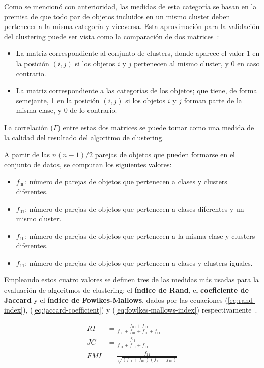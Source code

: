 Como se mencionó con anterioridad, las medidas de esta categoría se basan en la premisa de que todo par de objetos incluidos en un mismo cluster deben pertenecer a la misma categoría y viceversa.
Esta aproximación para la validación del clustering puede ser vista como la comparación de dos matrices~\cite{Tan05}:

\begin{itemize}
    \item La matriz correspondiente al conjunto de clusters, donde aparece el valor 1 en la posición $(i,j)$ si los objetos $i$ y $j$ pertenecen al mismo cluster, y 0 en caso contrario.
    \item La matriz correspondiente a las categorías de los objetos;
    que tiene, de forma semejante, 1 en la posición $(i, j)$ si los objetos $i$ y $j$ forman parte de la misma clase, y 0 de lo contrario.
\end{itemize}

La correlación ($\Gamma$) entre estas dos matrices se puede tomar como una medida de la calidad del resultado del algoritmo de clustering.

A partir de las $n(n-1)/2$ parejas de objetos que pueden formarse en el conjunto de datos, se computan los siguientes valores:

\begin{itemize}
    \item $f_{00}$: número de parejas de objetos que pertenecen a clases y clusters diferentes.
    \item $f_{01}$: número de parejas de objetos que pertenecen a clases diferentes y un mismo cluster.
    \item $f_{10}$: número de parejas de objetos que pertenecen a la misma clase y clusters diferentes.
    \item $f_{11}$: número de parejas de objetos que pertenecen a clases y clusters iguales.
\end{itemize}

Empleando estos cuatro valores se definen tres de las medidas más usadas para la evaluación de algoritmos de clustering: el \textbf{índice de Rand}, el \textbf{coeficiente de Jaccard} y el \textbf{índice de Fowlkes-Mallows}, dados por las ecuaciones (\ref{eq:rand-index}), (\ref{eq:jaccard-coefficient}) y (\ref{eq:fowlkes-mallows-index}) respectivamente~\cite{Wagner07,Tan05,Aggarawal13}.

\begin{align}
    \label{eq:rand-index}
    RI & = \frac{f_{00} + f_{11}}{f_{00}+f_{01}+f_{10}+f_{11}} \\
    \label{eq:jaccard-coefficient}
    JC & = \frac{f_{11}}{f_{01}+f_{10}+f_{11}} \\
    \label{eq:fowlkes-mallows-index}
    FMI & = \frac{f_{11}}{\sqrt{(f_{11}+f_{01})(f_{11}+f_{10})}}
\end{align}

